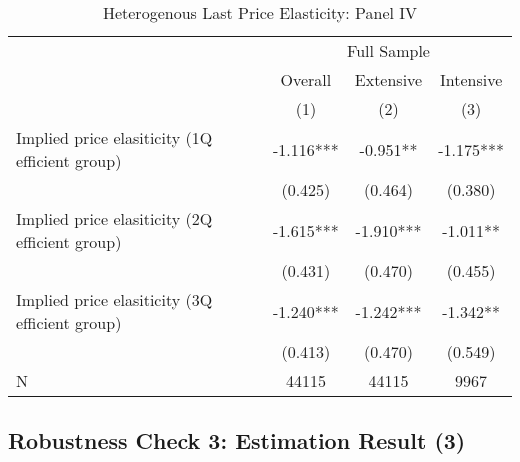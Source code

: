\documentclass[ review  , 3p ]{elsarticle}
\begin{document}
  \begin{table}
  
  \caption{\label{tab:kableHeteroShortElasticitySlide2}Heterogenous Last Price Elasticity: Panel IV}
  \centering
  \fontsize{8}{10}\selectfont
  \begin{tabular}[t]{lccc}
  \toprule
  \multicolumn{1}{c}{ } & \multicolumn{3}{c}{Full Sample} \\
  \cmidrule(l{3pt}r{3pt}){2-4}
  \multicolumn{1}{c}{ } & \multicolumn{1}{c}{Overall} & \multicolumn{1}{c}{Extensive} & \multicolumn{1}{c}{Intensive} \\
  \cmidrule(l{3pt}r{3pt}){2-2} \cmidrule(l{3pt}r{3pt}){3-3} \cmidrule(l{3pt}r{3pt}){4-4}
   & (1) & (2) & (3)\\
  \midrule
  Implied price elasiticity (1Q efficient group) & -1.116*** & -0.951** & -1.175***\\
   & (0.425) & (0.464) & (0.380)\\
  Implied price elasiticity (2Q efficient group) & -1.615*** & -1.910*** & -1.011**\\
   & (0.431) & (0.470) & (0.455)\\
  Implied price elasiticity (3Q efficient group) & -1.240*** & -1.242*** & -1.342**\\
   & (0.413) & (0.470) & (0.549)\\
  N & 44115 & 44115 & 9967\\
  \bottomrule
  \end{tabular}
  \end{table}
  
  \hypertarget{robustness-check-3-estimation-result-3}{%
  \subsection{Robustness Check 3: Estimation Result (3)}\label{robustness-check-3-estimation-result-3}}
  
\end{document}
